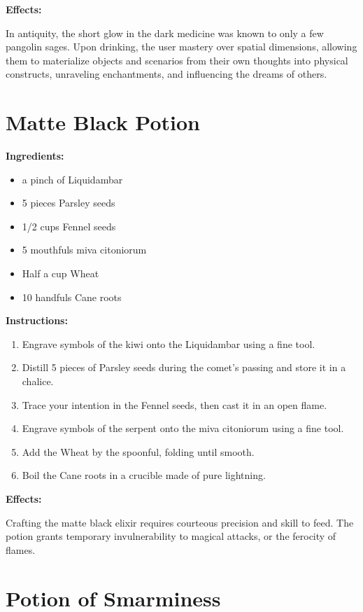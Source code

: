 \documentclass{article}
\begin{document}
\textbf{Effects:}

In antiquity, the short glow in the dark medicine was known to only a few pangolin sages. Upon drinking, the user mastery over spatial dimensions, allowing them to materialize objects and scenarios from their own thoughts into physical constructs, unraveling enchantments, and influencing the dreams of others.

\newpage
\section*{Matte Black Potion}

\textbf{Ingredients:}

\begin{itemize}
  \item a pinch of Liquidambar
  \item 5 pieces Parsley seeds
  \item 1/2 cups Fennel seeds
  \item 5 mouthfuls miva citoniorum
  \item Half a cup Wheat
  \item 10 handfuls Cane roots
\end{itemize}

\textbf{Instructions:}

\begin{enumerate}
  \item Engrave symbols of the kiwi onto the Liquidambar using a fine tool.
  \item Distill 5 pieces of Parsley seeds during the comet’s passing and store it in a chalice.
  \item Trace your intention in the Fennel seeds, then cast it in an open flame.
  \item Engrave symbols of the serpent onto the miva citoniorum using a fine tool.
  \item Add the Wheat by the spoonful, folding until smooth.
  \item Boil the Cane roots in a crucible made of pure lightning.
\end{enumerate}

\textbf{Effects:}

Crafting the matte black elixir requires courteous precision and skill to feed. The potion grants temporary invulnerability to magical attacks, or the ferocity of flames.

\newpage
\section*{Potion of Smarminess}
\end{document}
